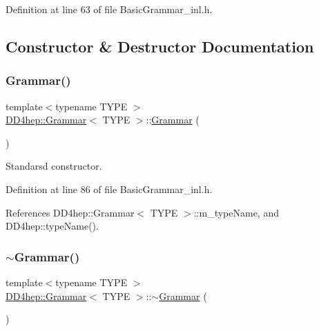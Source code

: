 Definition at line 63 of file Basic\+Grammar\+\_\+inl.\+h.



\subsection{Constructor \& Destructor Documentation}
\hypertarget{class_d_d4hep_1_1_grammar_a38672ae640c8b5a7e36af4084878f74a}{}\label{class_d_d4hep_1_1_grammar_a38672ae640c8b5a7e36af4084878f74a} 
\subsubsection{\texorpdfstring{Grammar()}{Grammar()}}
{\footnotesize\ttfamily template$<$typename T\+Y\+PE $>$ \\
\hyperlink{class_d_d4hep_1_1_grammar}{D\+D4hep\+::\+Grammar}$<$ T\+Y\+PE $>$\+::\hyperlink{class_d_d4hep_1_1_grammar}{Grammar} (\begin{DoxyParamCaption}{ }\end{DoxyParamCaption})}



Standarsd constructor. 



Definition at line 86 of file Basic\+Grammar\+\_\+inl.\+h.



References D\+D4hep\+::\+Grammar$<$ T\+Y\+P\+E $>$\+::m\+\_\+type\+Name, and D\+D4hep\+::type\+Name().

\hypertarget{class_d_d4hep_1_1_grammar_a53982c366a911db255f51de19d9ce9ef}{}\label{class_d_d4hep_1_1_grammar_a53982c366a911db255f51de19d9ce9ef} 
\subsubsection{\texorpdfstring{$\sim$\+Grammar()}{~Grammar()}}
{\footnotesize\ttfamily template$<$typename T\+Y\+PE $>$ \\
\hyperlink{class_d_d4hep_1_1_grammar}{D\+D4hep\+::\+Grammar}$<$ T\+Y\+PE $>$\+::$\sim$\hyperlink{class_d_d4hep_1_1_grammar}{Grammar} (\begin{DoxyParamCaption}{ }\end{DoxyParamCaption})\hspace{0.3cm}{\ttfamily [virtual]}}



